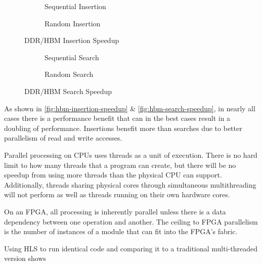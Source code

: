 \begin{figure}[H]
	\centering
	\begin{subfigure}{7.5cm}
		\centering
		
		\caption{Sequential Insertion}
		\label{fig:hbm-speedup-sequential-insertion}
	\end{subfigure}
	\begin{subfigure}{7.5cm}
		\centering
		
		\caption{Random Insertion}
		\label{fig:hbm-speedup-random-insertion}
	\end{subfigure}
	\caption{DDR/HBM Insertion Speedup}
	\label{fig:hbm-insertion-speedup}
\end{figure}

\begin{figure}[H]
	\centering
	\begin{subfigure}{7.5cm}
		\centering
		
		\caption{Sequential Search}
		\label{fig:hbm-speedup-sequential-search}
	\end{subfigure}
	\begin{subfigure}{7.5cm}
		\centering
		
		\caption{Random Search}
		\label{fig:hbm-speedup-random-search}
	\end{subfigure}
	\caption{DDR/HBM Search Speedup}
	\label{fig:hbm-search-speedup}
\end{figure}

As shown in \autoref{fig:hbm-insertion-speedup} \&
\autoref{fig:hbm-search-speedup}, in nearly all cases there is a performance
benefit that can in the best cases result in a doubling of performance.
Insertions benefit more than searches due to better parallelism of read and
write accesses.



Parallel processing on CPUs uses threads as a unit of execution. There is no
hard limit to how many threads that a program can create, but there will be no
speedup from using more threads than the physical CPU can support. Additionally,
threads sharing physical cores through simultaneous multithreading will not
perform as well as threads running on their own hardware cores.

On an FPGA, all processing is inherently parallel unless there is a data
dependency between one operation and another. The ceiling to FPGA parallelism is
the number of instances of a module that can fit into the FPGA's fabric.

Using HLS to run identical code and comparing it to a traditional multi-threaded
version shows \todo{\ldots}


